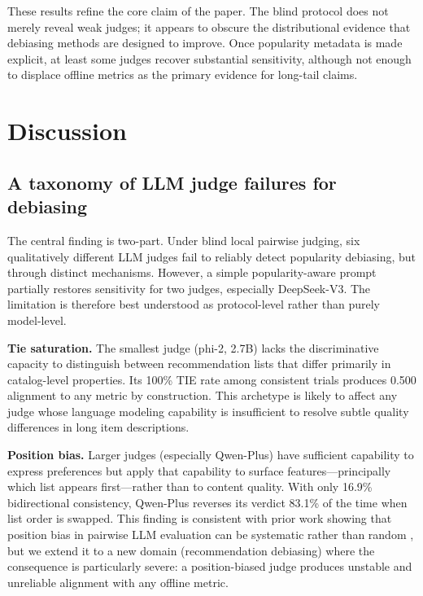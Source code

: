 \documentclass[pdflatex,sn-basic,referee,lineno]{sn-jnl}
\begin{document}
These results refine the core claim of the paper. The blind protocol does not merely reveal weak judges; it appears to obscure the distributional evidence that debiasing methods are designed to improve. Once popularity metadata is made explicit, at least some judges recover substantial sensitivity, although not enough to displace offline metrics as the primary evidence for long-tail claims.

\section{Discussion}
\label{sec:discussion}

\subsection{A taxonomy of LLM judge failures for debiasing}

The central finding is two-part. Under blind local pairwise judging, six qualitatively different LLM judges fail to reliably detect popularity debiasing, but through distinct mechanisms. However, a simple popularity-aware prompt partially restores sensitivity for two judges, especially DeepSeek-V3. The limitation is therefore best understood as protocol-level rather than purely model-level.

\noindent\textbf{Tie saturation.}  The smallest judge (phi-2, 2.7B) lacks the discriminative capacity to distinguish between recommendation lists that differ primarily in catalog-level properties. Its 100\% TIE rate among consistent trials produces 0.500 alignment to any metric by construction. This archetype is likely to affect any judge whose language modeling capability is insufficient to resolve subtle quality differences in long item descriptions.

\noindent\textbf{Position bias.}  Larger judges (especially Qwen-Plus) have sufficient capability to express preferences but apply that capability to surface features---principally which list appears first---rather than to content quality. With only 16.9\% bidirectional consistency, Qwen-Plus reverses its verdict 83.1\% of the time when list order is swapped. This finding is consistent with prior work showing that position bias in pairwise LLM evaluation can be systematic rather than random \citep{raina2025judging}, but we extend it to a new domain (recommendation debiasing) where the consequence is particularly severe: a position-biased judge produces unstable and unreliable alignment with any offline metric.
\end{document}
